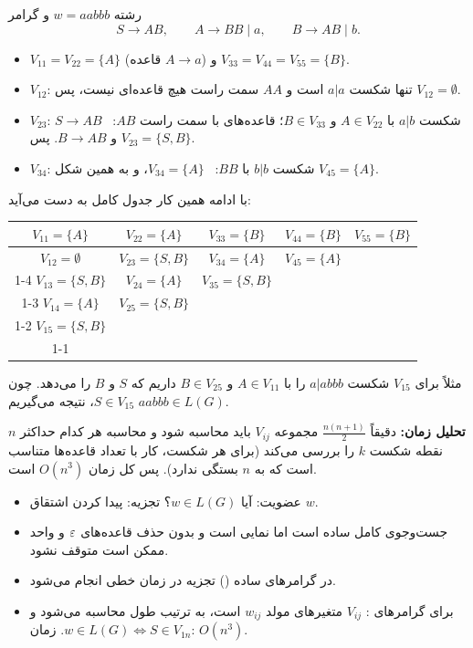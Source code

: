 \begin{example}
رشته $w=aabbb$ و گرامر
\[S\to AB,\qquad A\to BB\mid a,\qquad B\to AB\mid b.\]
\begin{itemize}
\item $V_{11}=V_{22}=\{A\}$ (قاعده $A\to a$) و $V_{33}=V_{44}=V_{55}=\{B\}$.
\item $V_{12}$: تنها شکست $a|a$ است و $AA$ سمت راست هیچ قاعده‌ای نیست، پس $V_{12}=\emptyset$.
\item $V_{23}$: شکست $a|b$ با $A\in V_{22}$ و $B\in V_{33}$؛ قاعده‌های با سمت راست $AB$: \ $S\to AB$ و $B\to AB$. پس $V_{23}=\{S,B\}$.
\item $V_{34}$: شکست $b|b$ با $BB$: \ $V_{34}=\{A\}$، و به همین شکل $V_{45}=\{A\}$.
\end{itemize}
با ادامه همین کار جدول کامل به دست می‌آید:
\begin{ltrfig}
\renewcommand{\arraystretch}{1.3}
\begin{tabular}{|c|c|c|c|c|}
\hline
$V_{11}=\{A\}$ & $V_{22}=\{A\}$ & $V_{33}=\{B\}$ & $V_{44}=\{B\}$ & $V_{55}=\{B\}$\\ \hline
$V_{12}=\emptyset$ & $V_{23}=\{S,B\}$ & $V_{34}=\{A\}$ & $V_{45}=\{A\}$ & \multicolumn{1}{c}{}\\ \cline{1-4}
$V_{13}=\{S,B\}$ & $V_{24}=\{A\}$ & $V_{35}=\{S,B\}$ & \multicolumn{2}{c}{}\\ \cline{1-3}
$V_{14}=\{A\}$ & $V_{25}=\{S,B\}$ & \multicolumn{3}{c}{}\\ \cline{1-2}
$V_{15}=\{S,B\}$ & \multicolumn{4}{c}{}\\ \cline{1-1}
\end{tabular}
\end{ltrfig}
مثلاً برای $V_{15}$ شکست $a|abbb$ را با $A\in V_{11}$ و $B\in V_{25}$ داریم که $S$ و $B$ را می‌دهد. چون $S\in V_{15}$، نتیجه می‌گیریم $aabbb\in L(G)$.
\end{example}

\textbf{تحلیل زمان:} دقیقاً $\frac{n(n+1)}{2}$ مجموعه $V_{ij}$ باید محاسبه شود و محاسبه هر کدام حداکثر $n$ نقطه شکست $k$ را بررسی می‌کند (برای هر شکست، کار با تعداد قاعده‌ها متناسب است که به $n$ بستگی ندارد). پس کل زمان $O(n^3)$ است.

\begin{summary}
\begin{itemize}
\item عضویت: آیا $w\in L(G)$؟ تجزیه: پیدا کردن اشتقاق $w$.
\item جست‌وجوی کامل ساده است اما نمایی است و بدون حذف قاعده‌های $\varepsilon$ و واحد ممکن است متوقف نشود.
\item در گرامرهای ساده () تجزیه در زمان خطی انجام می‌شود.
\item {} برای گرامرهای : $V_{ij}$ متغیرهای مولد $w_{ij}$ است، به ترتیب طول محاسبه می‌شود و $w\in L(G)\iff S\in V_{1n}$. زمان: $O(n^3)$.
\end{itemize}
\end{summary}
